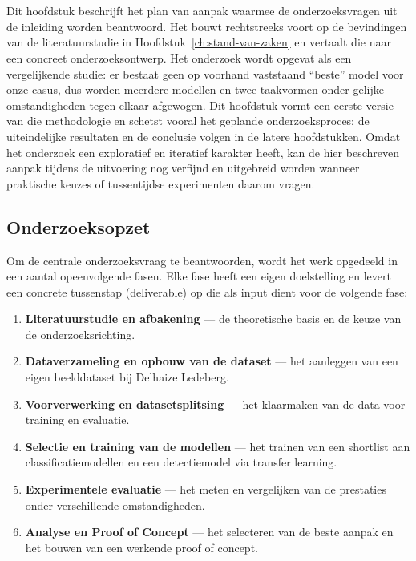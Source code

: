 
\chapter{}%
\label{ch:methodologie}

Dit hoofdstuk beschrijft het plan van aanpak waarmee de onderzoeksvragen uit de
inleiding worden beantwoord. Het bouwt rechtstreeks voort op de bevindingen van de
literatuurstudie in Hoofdstuk~\ref{ch:stand-van-zaken} en vertaalt die naar een
concreet onderzoeksontwerp. Het onderzoek wordt opgevat als een vergelijkende
studie: er bestaat geen op voorhand vaststaand ``beste'' model voor onze casus,
dus worden meerdere modellen en twee taakvormen onder gelijke omstandigheden tegen
elkaar afgewogen. Dit hoofdstuk vormt een eerste versie van die methodologie en
schetst vooral het geplande onderzoeksproces; de uiteindelijke resultaten en de
conclusie volgen in de latere hoofdstukken. Omdat het onderzoek een exploratief en
iteratief karakter heeft, kan de hier beschreven aanpak tijdens de uitvoering nog
verfijnd en uitgebreid worden wanneer praktische keuzes of tussentijdse experimenten
daarom vragen.

\section{Onderzoeksopzet}

Om de centrale onderzoeksvraag te beantwoorden, wordt het werk opgedeeld in een
aantal opeenvolgende fasen. Elke fase heeft een eigen doelstelling en levert een
concrete tussenstap (deliverable) op die als input dient voor de volgende fase:

\begin{enumerate}
    \item \textbf{Literatuurstudie en afbakening} --- de theoretische basis en de
    keuze van de onderzoeksrichting.
    \item \textbf{Dataverzameling en opbouw van de dataset} --- het aanleggen van een
    eigen beelddataset bij Delhaize Ledeberg.
    \item \textbf{Voorverwerking en datasetsplitsing} --- het klaarmaken van de data
    voor training en evaluatie.
    \item \textbf{Selectie en training van de modellen} --- het trainen van een
    shortlist aan classificatiemodellen en een detectiemodel via transfer
    learning.
    \item \textbf{Experimentele evaluatie} --- het meten en vergelijken van de
    prestaties onder verschillende omstandigheden.
    \item \textbf{Analyse en Proof of Concept} --- het selecteren van de beste aanpak
    en het bouwen van een werkende proof of concept.
\end{enumerate}

